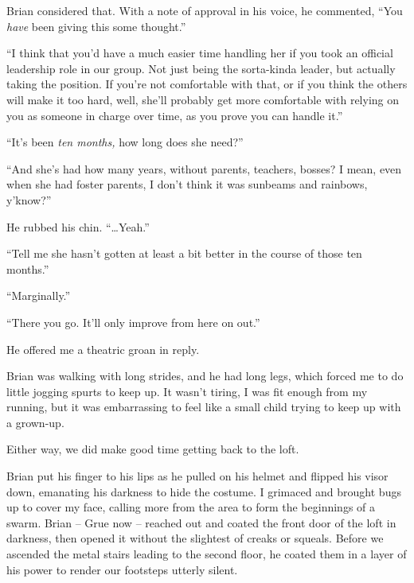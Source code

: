 Brian considered that.  With a note of approval in his voice, he commented, ``You \emph{have} been giving this some thought.''



``I think that you'd have a much easier time handling her if you took an official leadership role in our group.  Not just being the sorta-kinda leader, but actually taking the position.  If you're not comfortable with that, or if you think the others will make it too hard, well, she'll probably get more comfortable with relying on you as someone in charge over time, as you prove you can handle it.''



``It's been \emph{ten months, }how long does she need?''



``And she's had how many years, without parents, teachers, bosses?  I mean, even when she had foster parents, I don't think it was sunbeams and rainbows, y'know?''



He rubbed his chin.  ``\ldots{}Yeah.''



``Tell me she hasn't gotten at least a bit better in the course of those ten months.''



``Marginally.''



``There you go.  It'll only improve from here on out.''



He offered me a theatric groan in reply.



Brian was walking with long strides, and he had long legs, which forced me to do little jogging spurts to keep up.  It wasn't tiring, I was fit enough from my running, but it was embarrassing to feel like a small child trying to keep up with a grown-up.



Either way, we did make good time getting back to the loft.



Brian put his finger to his lips as he pulled on his helmet and flipped his visor down, emanating his darkness to hide the costume.  I grimaced and brought bugs up to cover my face, calling more from the area to form the beginnings of a swarm.  Brian – Grue now – reached out and coated the front door of the loft in darkness, then opened it without the slightest of creaks or squeals.  Before we ascended the metal stairs leading to the second floor, he coated them in a layer of his power to render our footsteps utterly silent.



